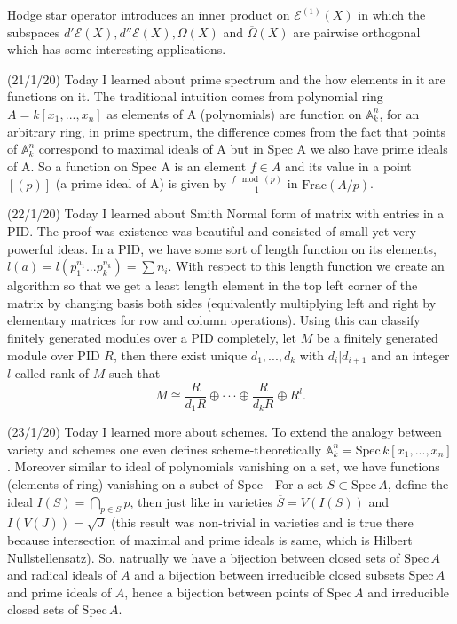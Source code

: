 \documentclass[12pt,a4paper]{article}
\begin{document}
Hodge star operator introduces an inner product on $\mathcal{E}^{(1)}(X)$ in which the subspaces \linebreak $d'\mathcal{E}(X),d''\mathcal{E}(X),\Omega(X)$ and $\overline{\Omega}(X)$ are pairwise orthogonal which has some interesting applications.

(21/1/20) Today I learned about prime spectrum and the how elements in it are functions on it. The traditional intuition comes from polynomial ring $A=k[x_1,...,x_n]$ as elements of A (polynomials) are function on $\mathbb A^n_k$, for an arbitrary ring, in prime spectrum, the difference comes from the fact that points of $\mathbb A^n_k$ correspond to maximal ideals of A but in Spec A we also have prime ideals of A. So a function on Spec A is an element $f\in A$ and its value in a point $[(p)]$ (a prime ideal of A) is given by $\frac{f \mod (p)}{1} $ in $\text{Frac} (A/p)$. 

(22/1/20) Today I learned about Smith Normal form of matrix with entries in a PID. The proof was existence was beautiful and consisted of small yet very powerful ideas. In a PID, we have some sort of length function on its elements, $l(a)=l(p_1^{n_1}...p_k^{n_k}) = \sum n_i$. With respect to this length function we create an algorithm so that we get a least length element in the top left corner of the matrix by changing basis both sides (equivalently multiplying left and right by elementary matrices for row and column operations). Using this can classify finitely generated modules over a PID completely, let $M$ be a finitely generated module over PID $R$, then there exist unique $d_1,...,d_k$ with $d_i|d_{i+1}$ and an integer $l$ called rank of $M$ such that \[ M \cong \frac{R}{d_1R} \oplus \cdot\cdot\cdot \oplus \frac{R}{d_k R} \oplus R^l. \] 

(23/1/20) Today I learned more about schemes. To extend the analogy between variety and schemes one even defines scheme-theoretically $\mathbb A^n_k = \text{Spec} \, k[x_1,...,x_n]$. Moreover similar to ideal of polynomials vanishing on a set, we have functions (elements of ring) vanishing on a subet of Spec - For a set $S \subset \text{Spec}\, A$, define the ideal $I(S)= \bigcap_{p \in S} p$, then just like in varieties $\overline{S}=V(I(S))$ and $I(V(J))= \sqrt{J}$ (this result was non-trivial in varieties and is true there because intersection of maximal and prime ideals is same, which is Hilbert Nullstellensatz). So, natrually we have a bijection between closed sets of $\text{Spec} \, A$ and radical ideals of $A$ and a bijection between irreducible closed subsets $\text{Spec} \, A$ and prime ideals of $A$, hence a bijection between points of $\text{Spec} \, A$ and irreducible closed sets of $\text{Spec} \, A$.
\end{document}
